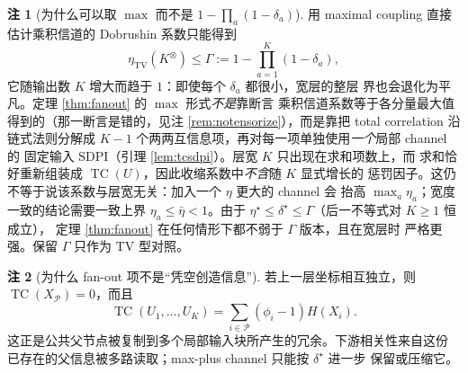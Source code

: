 \documentclass[a4paper,11pt]{article}
\theoremstyle{definition}
\newtheorem{remark}{注}
\newcommand{\1}{\mathbf 1}
\newcommand{\TV}{\mathrm{TV}}
\newcommand{\TC}{\operatorname{TC}}
\newcommand{\Kprod}{K^{\otimes}}
\newcommand{\Pset}{\mathcal P}
\begin{document}
\begin{remark}[为什么可以取 $\max$ 而不是 $1-\prod_a(1-\delta_a)$]
\label{rem:whymax}
用 maximal coupling 直接估计乘积信道的 Dobrushin 系数只能得到
\[
\eta_{\TV}(\Kprod)\le\Gamma:=1-\prod_{a=1}^{K}(1-\delta_a),
\]
它随输出数 $K$ 增大而趋于 $1$：即使每个 $\delta_a$ 都很小，宽层的整层
界也会退化为平凡。定理 \ref{thm:fanout} 的 $\max$ 形式\emph{不是}靠断言
乘积信道系数等于各分量最大值得到的（那一断言是错的，见注
\ref{rem:notensorize}），而是靠把 total correlation 沿链式法则分解成
$K-1$ 个两两互信息项，再对每一项单独使用\emph{一个}局部 channel 的
固定输入 SDPI（引理 \ref{lem:tcsdpi}）。层宽 $K$ 只出现在求和项数上，而
求和恰好重新组装成 $\TC(U)$，因此收缩系数中\emph{不含}随 $K$ 显式增长的
惩罚因子。这仍不等于说该系数与层宽无关：加入一个 $\eta$ 更大的 channel 会
抬高 $\max_a\eta_a$；宽度一致的结论需要一致上界 $\eta_a\le\bar\eta<1$。由于
$\eta^\star\le\delta^\star\le\Gamma$（后一不等式对 $K\ge1$ 恒成立），
定理 \ref{thm:fanout} 在任何情形下都不弱于 $\Gamma$ 版本，且在宽层时
严格更强。保留 $\Gamma$ 只作为 TV 型对照。
\end{remark}

\begin{remark}[为什么 fan-out 项不是“凭空创造信息”]
若上一层坐标相互独立，则 $\TC(X_{\Pset})=0$，而且
\[
\TC(U_1,\ldots,U_K)
=
\sum_{i\in\Pset}(\phi_i-1)H(X_i).
\]
这正是公共父节点被复制到多个局部输入块所产生的冗余。下游相关性来自这份
已存在的父信息被多路读取；max-plus channel 只能按 $\delta^\star$ 进一步
保留或压缩它。
\end{remark}
\end{document}
